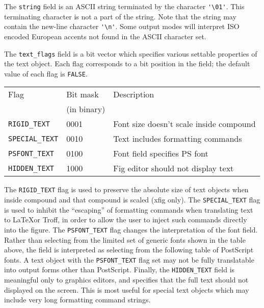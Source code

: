 The {\tt string} field is an ASCII string terminated by the character
	\verb|'\01'|.
This terminating character is not a part of the	string.
Note that the string may contain the new-line character \verb|'\n'|.
Some output modes will interpret ISO encoded European accents
	not found in the ASCII character set.

The {\tt text\_flags} field is a bit vector which specifies various
	settable properties of the text object.
Each flag corresponds to a bit position in the field; the default value
	of each flag is {\tt FALSE}.

\begin{center}
\begin{tabular}{|l|l|l|}
\hline
Flag			& Bit mask	& Description		\\
			& (in binary)	&			\\ \hline
\hline
%
{\tt RIGID\_TEXT}	& 0001 	&
			Font size doesn't scale inside compound\\ \hline
%
{\tt SPECIAL\_TEXT}	& 0010	&  Text includes formatting commands \\ \hline
%
{\tt PSFONT\_TEXT}	& 0100	&  Font field specifies PS font	\\ \hline
%
{\tt HIDDEN\_TEXT}	& 1000	&  Fig editor should not display text \\ \hline
\end{tabular}
\end{center}

The {\tt RIGID\_TEXT} flag is used to preserve the absolute size of text
	objects when inside compound and that compound is scaled (xfig only).
The {\tt SPECIAL\_TEXT} flag is used to inhibit the ``escaping'' of formatting
	commands when translating text to \LaTeX or Troff, in order to allow
	the user to inject such commands directly into the figure.
The {\tt PSFONT\_TEXT} flag changes the interpretation of the font
	field.
Rather than selecting from the limited set of generic fonts shown in the table
	above, the field is interpreted as selecting from the following table
	of PostScript fonts.
A text object with the {\tt PSFONT\_TEXT} flag set may not be fully 
	translatable into output forms other than PostScript.
Finally, the {\tt HIDDEN\_TEXT} field is meaningful only to graphics editors,
	and specifies that the full text should not displayed on the screen.
This is most useful for special text objects which may include very long
	formatting command strings.

